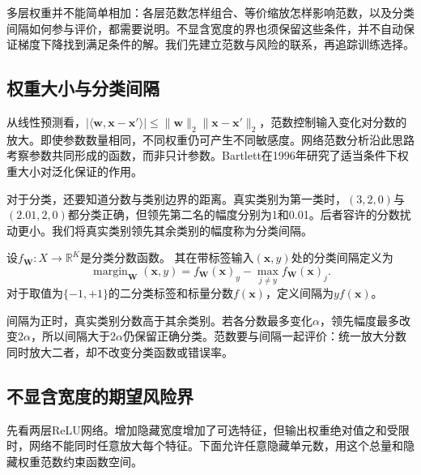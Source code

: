 多层权重并不能简单相加：各层范数怎样组合、等价缩放怎样影响范数，以及分类间隔如何参与评价，都需要说明。不显含宽度的界也须保留这些条件，并不自动保证梯度下降找到满足条件的解。我们先建立范数与风险的联系，再追踪训练选择。

\subsection{权重大小与分类间隔}

从线性预测看，$|\langle\bm w,\bm x-\bm x'\rangle|\leq\|\bm w\|_2\|\bm x-\bm x'\|_2$，范数控制输入变化对分数的放大。即使参数数量相同，不同权重仍可产生不同敏感度。网络范数分析沿此思路考察参数共同形成的函数，而非只计参数。Bartlett在1996年研究了适当条件下权重大小对泛化保证的作用。

对于分类，还要知道分数与类别边界的距离。真实类别为第一类时，$(3,2,0)$与$(2.01,2,0)$都分类正确，但领先第二名的幅度分别为1和0.01。后者容许的分数扰动更小。我们将真实类别领先其余类别的幅度称为分类间隔。

\begin{definition}[分类间隔]
\label{def:network-margin}
设$f_{\bm W}:X\to\mathbb R^K$是分类分数函数。
其在带标签输入$(\bm x,y)$处的分类间隔定义为
\begin{equation}
 \operatorname{margin}_{\bm W}(\bm x,y)
 =f_{\bm W}(\bm x)_y-\max_{j\neq y}f_{\bm W}(\bm x)_j.
 \label{eq:network-margin}
\end{equation}
对于取值为$\{-1,+1\}$的二分类标签和标量分数$f(\bm x)$，定义间隔为$yf(\bm x)$。
\end{definition}

间隔为正时，真实类别分数高于其余类别。若各分数最多变化$\alpha$，领先幅度最多改变$2\alpha$，所以间隔大于$2\alpha$仍保留正确分类。范数要与间隔一起评价：统一放大分数同时放大二者，却不改变分类函数或错误率。

\subsection{不显含宽度的期望风险界}

先看两层ReLU网络。增加隐藏宽度增加了可选特征，但输出权重绝对值之和受限时，网络不能同时任意放大每个特征。下面允许任意隐藏单元数，用这个总量和隐藏权重范数约束函数空间。

